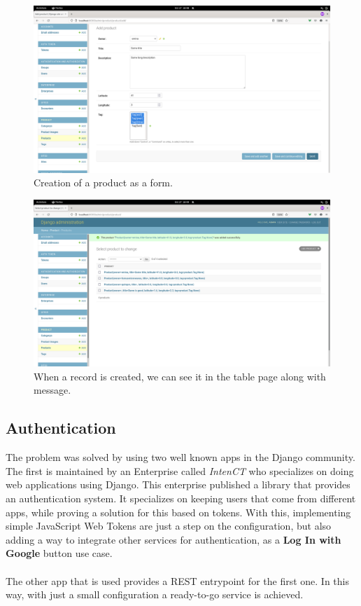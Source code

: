 \documentclass[./main.tex]{subfiles}
\begin{document}
\begin{figure}[H]
	\centering
	\includegraphics[width=0.9\linewidth]{img/admin-img-4.png}
	\caption{Creation of a product as a form.}
	\label{fig:admin-4}
\end{figure}

\begin{figure}[H]
	\centering
	\includegraphics[width=0.9\linewidth]{img/admin-img-5.png}
	\caption{When a record is created, we can see it in the table page along with message.}
	\label{fig:admin-5}
\end{figure}
\subsection{Authentication}

The problem was solved by using two well known apps in the Django
community. The first is maintained by an Enterprise called \emph{IntenCT}
who specializes on doing web applications using Django. This enterprise
published a library that provides an authentication system. It
specializes on keeping users that come from different apps, while
proving a solution for this based on tokens. With this, implementing
simple JavaScript Web Tokens are just a step on the configuration, but
also adding a way to integrate other services for authentication, as a
\textbf{Log In with Google} button use case.\\
\\
The other app that is used provides a REST entrypoint for the first one.
In this way, with just a small configuration a ready-to-go service is
achieved.
\end{document}
